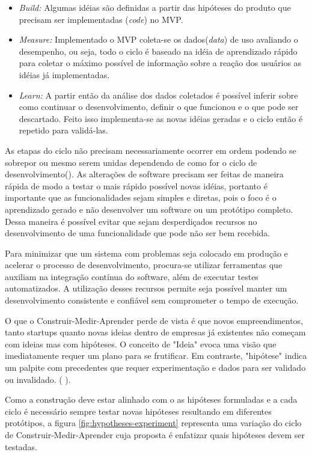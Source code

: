 \begin{itemize}
\item \emph{Build:} Algumas idéias são definidas a partir das hipóteses do produto que precisam ser implementadas (\emph{code}) no MVP.
\item \emph{Measure:} Implementado o MVP coleta-se os dados(\emph{data}) de uso avaliando o desempenho, ou seja, todo o ciclo é baseado na idéia de aprendizado rápido para coletar o máximo possível de informação sobre a reação dos usuários as idéias já implementadas.
\item \emph{Learn:} A partir então da análise dos dados coletados é possível inferir sobre como continuar o desenvolvimento, definir o que funcionou e o que pode ser descartado. Feito isso implementa-se as novas idéias geradas e o ciclo então é repetido para validá-las.
\end{itemize}
\par As etapas do ciclo não precisam necessariamente ocorrer em ordem podendo se sobrepor ou mesmo serem unidas dependendo de como for o ciclo de desenvolvimento(\cite{ries:11}). As alterações de software precisam ser feitas de maneira rápida de modo a testar o mais rápido possível novas idéias, portanto é importante que as funcionalidades sejam simples e diretas, pois o foco é o aprendizado gerado e não desenvolver um software ou um protótipo completo. Dessa maneira é possível evitar que sejam desperdiçados recursos no desenvolvimento de uma funcionalidade que pode não ser bem recebida.
\par Para minimizar que um sistema com problemas seja colocado em produção e acelerar o processo de desenvolvimento, procura-se utilizar ferramentas que auxiliam na integração contínua do software, além de executar testes automatizados. A utilização desses recursos permite seja possível manter um desenvolvimento consistente e confiável sem comprometer o tempo de execução.
\par O que o Construir-Medir-Aprender perde de vista é que novos empreendimentos, tanto startups quanto novas ideias dentro de empresas já existentes não começam com ideias mas com hipóteses. O conceito de "Ideia" evoca uma visão que imediatamente requer um plano para se frutificar. Em contraste, "hipótese" indica um palpite com precedentes que requer experimentação e dados para ser validado ou invalidado. (\cite{blankendeavor} ).
\par Como a construção deve estar alinhado com o as hipóteses formuladas e a cada ciclo é necessário sempre testar novas hipóteses resultando em diferentes protótipos, a figura \ref{fig:hypotheses-experiment} representa uma variação do ciclo de Construir-Medir-Aprender cuja proposta é enfatizar quais hipóteses devem ser testadas.
